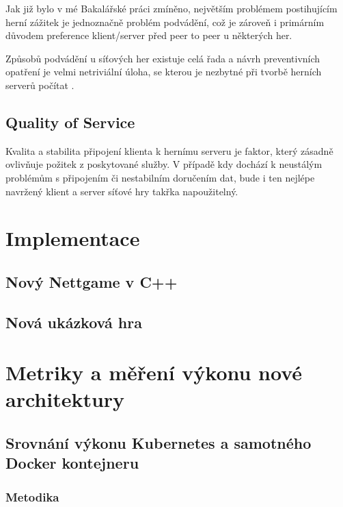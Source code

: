 \documentclass{article}
\begin{document}
Jak již bylo v mé Bakalářské práci zmíněno, největším problémem postihujícím herní zážitek je jednoznačně problém podvádění, což je zároveň i primárním důvodem preference klient/server před peer to peer u některých her.

Způsobů podvádění u síťových her existuje celá řada a návrh preventivních opatření je velmi netriviální úloha, se kterou je nezbytné při tvorbě herních serverů počítat \cite{moncek_theses}.%
\subsection{Quality of Service}
Kvalita a stabilita připojení klienta k hernímu serveru je faktor, který zásadně ovlivňuje požitek z poskytované služby. V případě kdy dochází k neustálým problémům s připojením či nestabilním doručením dat, bude i ten nejlépe navržený klient a server síťové hry takřka napoužitelný. 

\newpage

\newpage

\section{Implementace}

\subsection{Nový Nettgame v C++}

\subsection{Nová ukázková hra}

\newpage

\section{Metriky a měření výkonu nové architektury}

\subsection{Srovnání výkonu Kubernetes a samotného Docker kontejneru}

\subsubsection{Metodika}
\end{document}
